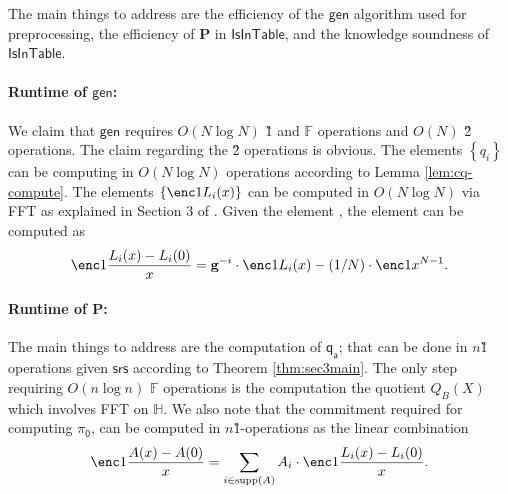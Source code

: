 \documentclass[11pt]{article} %
\newcommand{\F}{\ensuremath{\mathbb F}\xspace}
\newcommand{\srs}{\ensuremath{\mathsf{srs}}\xspace}
\newcommand{\gen}{\ensuremath{\mathsf{gen}}\xspace}
\newcommand{\prv}{\ensuremath{\mathsf{\mathbf{P}}}\xspace}
\newcommand{\set}[1]{\ensuremath{\left\{#1\right\}}\xspace}
\newcommand{\vgen}{\ensuremath{\mathbf{g}}\xspace}
\newcommand{\isintable}{\ensuremath{\mathsf{IsInTable}}\xspace}
\newcommand{\subspace}{\ensuremath{\mathbb{H}}\xspace}
\newcommand{\witsize}{\ensuremath{n}\xspace}
\newcommand{\witruntime}{\ensuremath{\witsize\log\witsize}\xspace}
\newcommand{\tabsize}{\ensuremath{N}\xspace}
\newcommand{\tabruntime}{\ensuremath{\tabsize\log\tabsize}\xspace}
\newcommand{\qa}{\ensuremath{\mathsf{q_a}}\xspace}
\newcommand{\zerproof}{\ensuremath{\mathsf{\pi_0}}\xspace}
\newcommand{\supp}[1]{\ensuremath{\mathrm{supp}(#1)}\xspace}
\begin{document}
                  
    The  main things to address are the efficiency of the \gen algorithm used for preprocessing, the efficiency of \prv in \isintable, and the knowledge soundness of \isintable.
    
    \paragraph{Runtime of \gen:}
We claim that \gen requires $O(\tabruntime)$ \G1 and \F operations and $O(\tabsize)$ \G2 operations.
The claim regarding the \G2 operations is obvious.
The elements \set{q_i} can be computing in $O(\tabruntime)$ operations according to Lemma \ref{lem:cq-compute}.
The elements \set{\enc1{L_i(x)}} can be computed in $O(\tabruntime)$ via FFT as explained in Section 3 of \cite{FirstMPC}.
Given the element , the element  can be computed as
\[\enc1{\frac{L_i(x)-L_i(0)}{x}}=\vgen^{-i}\cdot \enc1{L_i(x)}- (1/\tabsize)\cdot \enc1{x^{\tabsize-1}}.\]

\paragraph{Runtime of \prv:}
The main things to address are the computation of \qa; that can be done in \witsize \G1 operations given \srs according to Theorem \ref{thm:sec3main}.
The only step requiring $O(\witruntime)$ \F operations is the computation the quotient $Q_B(X)$ which involves FFT on \subspace.
We also note that the commitment  required for computing \zerproof, can be computed in \witsize \G1-operations
as the linear combination 
\[\enc1{\frac{A(x)-A(0)}{x}} =\sum_{i\in \supp{A}}A_i\cdot \enc1{\frac{L_i(x)-L_i(0)}{x}} . \]
\end{document}
